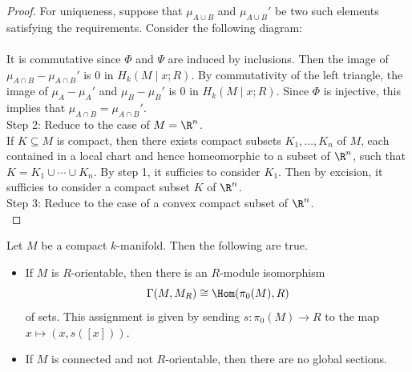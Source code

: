 \documentclass[a4paper]{article}
\begin{document}
\begin{prp}{}{}
\begin{proof}
For uniqueness, suppose that $\mu_{A\cup B}$ and $\mu_{A\cup B}'$ be two such elements satisfying the requirements. Consider the following diagram: \\
\\
It is commutative since $\Phi$ and $\Psi$ are induced by inclusions. Then the image of $\mu_{A\cap B}-\mu_{A\cap B}'$ is $0$ in $H_k(M\;|\;x;R)$. By commutativity of the left triangle, the image of $\mu_A-\mu_A'$ and $\mu_B-\mu_B'$ is $0$ in $H_k(M\;|\;x;R)$. Since $\Phi$ is injective, this implies that $\mu_{A\cap B}=\mu_{A\cap B}'$. \\

Step 2: Reduce to the case of $M=\R^n$. \\
If $K\subseteq M$ is compact, then there exists compact subsets $K_1,\dots,K_n$ of $M$, each contained in a local chart and hence homeomorphic to a subset of $\R^n$, such that $K=K_1\cup\cdots\cup K_n$. By step 1, it sufficies to consider $K_1$. Then by excision, it sufficies to consider a compact subset $K$ of $\R^n$. \\

Step 3: Reduce to the case of a convex compact subset of $\R^n$. \\
\end{proof}
\end{prp}

\begin{prp}{}{} Let $M$ be a compact $k$-manifold. Then the following are true. 
\begin{itemize}
\item If $M$ is $R$-orientable, then there is an $R$-module isomorphism $$\Gamma(M,M_R)\cong\Hom(\pi_0(M),R)$$ of sets. This assignment is given by sending $s:\pi_0(M)\to R$ to the map $x\mapsto(x,s([x]))$. 
\item If $M$ is connected and not $R$-orientable, then there are no global sections. 
\end{itemize}
\end{prp}
\end{document}
